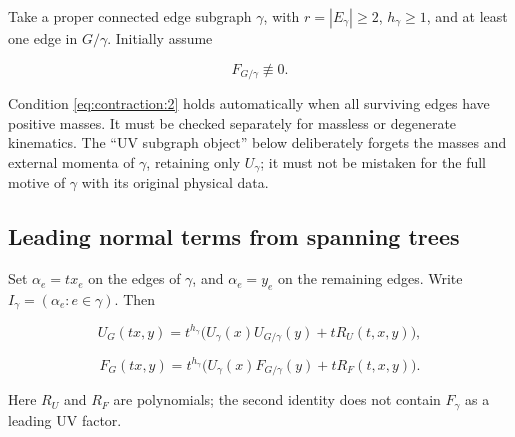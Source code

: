 \documentclass[11pt,a4paper,oneside]{article}
\theoremstyle{plain}
\theoremstyle{definition}
\theoremstyle{remark}
\numberwithin{equation}{section}
\begin{document}
Take a proper connected edge subgraph \(\gamma \), with \(r=|E_\gamma |\ge 2\), \(h_\gamma \ge 1\), and at least one edge in \(G/\gamma \). Initially assume

\begin{equation}
F_{G/\gamma}\not\equiv0.                  \label{eq:contraction:2}
\end{equation}

Condition \eqref{eq:contraction:2} holds automatically when all surviving edges have positive masses. It must be checked separately for massless or degenerate kinematics. The ``UV subgraph object'' below deliberately forgets the masses and external momenta of \(\gamma \), retaining only \(U_\gamma \); it must not be mistaken for the full motive of \(\gamma \) with its original physical data.


\subsection{Leading normal terms from spanning trees}\label{sec:contraction:2}

Set \(\alpha _e=t x_e\) on the edges of \(\gamma \), and \(\alpha _e=y_e\) on the remaining edges. Write \(I_\gamma =(\alpha _e:e\in \gamma )\). Then

\begin{equation}
U_G(tx,y)=t^{h_\gamma}\big(U_\gamma(x)U_{G/\gamma}(y)+tR_U(t,x,y)\big),
\end{equation}

\begin{equation}
F_G(tx,y)=t^{h_\gamma}\big(U_\gamma(x)F_{G/\gamma}(y)+tR_F(t,x,y)\big).       \label{eq:contraction:3}
\end{equation}

Here \(R_U\) and \(R_F\) are polynomials; the second identity does not contain \(F_\gamma \) as a leading UV factor.
\end{document}
